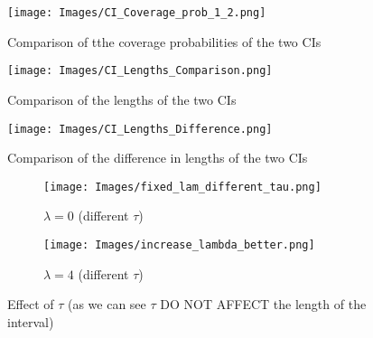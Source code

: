 \documentclass[12pt]{article}
\begin{document}
\begin{figure}[H]
\centering
\texttt{[image: Images/CI\_Coverage\_prob\_1\_2.png]}
\caption{Comparison of tthe coverage probabilities of the two CIs }
\end{figure}
\begin{figure}[H]
  \centering
  \texttt{[image: Images/CI\_Lengths\_Comparison.png]}
  \caption{Comparison of the lengths of the two CIs}
\end{figure}
\begin{figure}[H]
  \centering
  \texttt{[image: Images/CI\_Lengths\_Difference.png]}
  \caption{Comparison of the difference in lengths of the two CIs}
\end{figure}
\begin{figure}[H]
  \centering
    \begin{subfigure}[b]{0.45\textwidth}
      \texttt{[image: Images/fixed\_lam\_different\_tau.png]}
      \caption{$\lambda = 0$ (different $\tau$)}
    \end{subfigure}
    \hfill
    \begin{subfigure}[b]{0.45\textwidth}
      \texttt{[image: Images/increase\_lambda\_better.png]}
      \caption{$\lambda=4$ (different $\tau$)}
    \end{subfigure}
    \caption{Effect of $\tau$ (as we can see $\tau$ DO NOT AFFECT the length of the interval) }
\end{figure}
\end{document}
